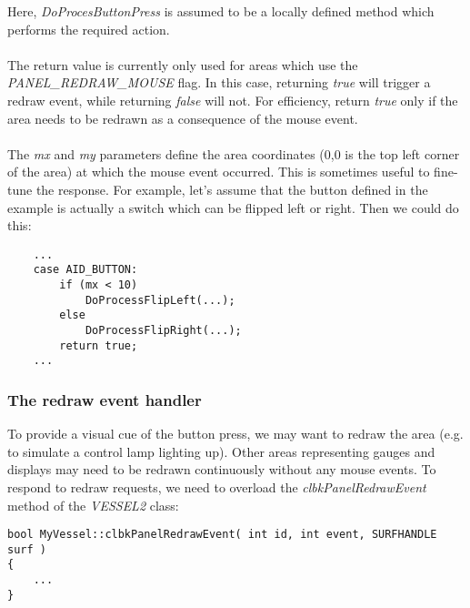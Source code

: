 \documentclass[Orbiter Developer Manual.tex]{subfiles}
\begin{document}
\noindent
Here, \textit{DoProcesButtonPress} is assumed to be a locally defined method which performs the required action.\\
\\
The return value is currently only used for areas which use the \textit{PANEL\_REDRAW\_MOUSE} flag. In this case, returning \textit{true} will trigger a redraw event, while returning \textit{false} will not. For efficiency, return \textit{true} only if the area needs to be redrawn as a consequence of the mouse event.\\
\\
The \textit{mx} and \textit{my} parameters define the area coordinates (0,0 is the top left corner of the area) at which the mouse event occurred. This is sometimes useful to fine-tune the response. For example, let's assume that the button defined in the example is actually a switch which can be flipped left or right. Then we could do this:

\begin{lstlisting}
	...
	case AID_BUTTON:
		if (mx < 10)
			DoProcessFlipLeft(...);
		else
			DoProcessFlipRight(...);
		return true;
	...
\end{lstlisting}


\subsubsection{The redraw event handler}
To provide a visual cue of the button press, we may want to redraw the area (e.g. to simulate a control lamp lighting up). Other areas representing gauges and displays may need to be redrawn continuously without any mouse events. To respond to redraw requests, we need to overload the \textit{clbkPanelRedrawEvent} method of the \textit{VESSEL2} class:

\begin{lstlisting}
bool MyVessel::clbkPanelRedrawEvent( int id, int event, SURFHANDLE surf )
{
	...
}
\end{lstlisting}
\end{document}
